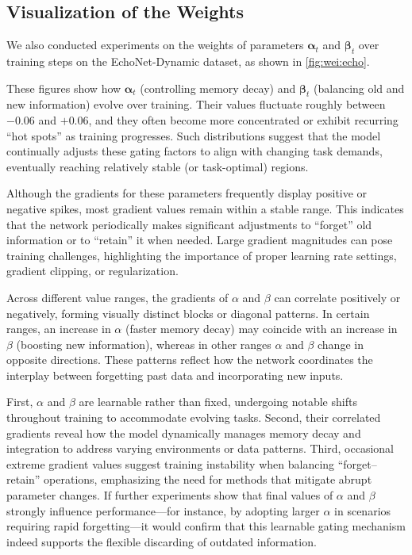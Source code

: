 \subsection{Visualization of the Weights}
We also conducted experiments on the weights of parameters $\boldsymbol{\alpha}_t$ and $\boldsymbol{\beta}_t$ over training steps on the EchoNet-Dynamic dataset, as shown in \cref{fig:wei:echo}. 

These figures show how $\boldsymbol{\alpha}_t$ (controlling memory decay) and $\boldsymbol{\beta}_t$ (balancing old and new information) evolve over training. Their values fluctuate roughly between $-0.06$ and $+0.06$, and they often become more concentrated or exhibit recurring ``hot spots'' as training progresses. Such distributions suggest that the model continually adjusts these gating factors to align with changing task demands, eventually reaching relatively stable (or task-optimal) regions.

%
            
%

Although the gradients for these parameters frequently display positive or negative spikes, most gradient values remain within a stable range. This indicates that the network periodically makes significant adjustments to ``forget'' old information or to ``retain'' it when needed. Large gradient magnitudes can pose training challenges, highlighting the importance of proper learning rate settings, gradient clipping, or regularization.

Across different value ranges, the gradients of $\alpha$ and $\beta$ can correlate positively or negatively, forming visually distinct blocks or diagonal patterns. In certain ranges, an increase in $\alpha$ (faster memory decay) may coincide with an increase in $\beta$ (boosting new information), whereas in other ranges $\alpha$ and $\beta$ change in opposite directions. These patterns reflect how the network coordinates the interplay between forgetting past data and incorporating new inputs.

First, $\alpha$ and $\beta$ are learnable rather than fixed, undergoing notable shifts throughout training to accommodate evolving tasks. 
Second, their correlated gradients reveal how the model dynamically manages memory decay and integration to address varying environments or data patterns. 
Third, occasional extreme gradient values suggest training instability when balancing ``forget--retain'' operations, emphasizing the need for methods that mitigate abrupt parameter changes. 
If further experiments show that final values of $\alpha$ and $\beta$ strongly influence performance---for instance, by adopting larger $\alpha$ in scenarios requiring rapid forgetting---it would confirm that this learnable gating mechanism indeed supports the flexible discarding of outdated information.